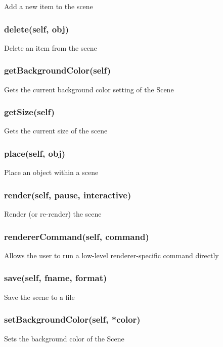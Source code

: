 Add a new item to the scene

\subsubsection{delete(self, obj)}

Delete an item from the scene

\subsubsection{getBackgroundColor(self)}

Gets the current background color setting of the Scene

\subsubsection{getSize(self)}

Gets the current size of the scene

\subsubsection{place(self, obj)}

Place an object within a scene

\subsubsection{render(self, pause, interactive)}

Render (or re-render) the scene

\subsubsection{rendererCommand(self, command)}

Allows the user to run a low-level renderer-specific command directly

\subsubsection{save(self, fname, format)}

Save the scene to a file

\subsubsection{setBackgroundColor(self, *color)}

Sets the background color of the Scene

